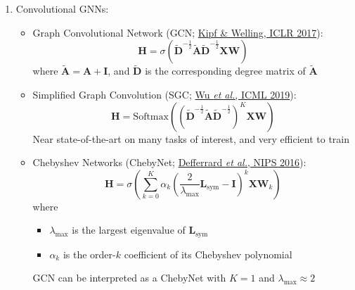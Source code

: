 \documentclass{article}
\begin{document}
\begin{enumerate}
\begin{figure}[h]
\begin{subfigure}[b]{0.3\textwidth}
			\caption{Message-passing}
			\label{fig:message-passing-gnn}
		\end{subfigure}
	\end{figure}
	\vspace*{-1.5\baselineskip}
	$$\begin{array}{ccc}
		\hspace*{-3em}\mathbf{h}_i=\phi\left(\mathbf{x}_i,\displaystyle\bigoplus_{j\in\mathcal{N}_i}c_{ij}\psi(\mathbf{x}_j)\right) & 
		\mathbf{h}_i=\phi\left(\mathbf{x}_i,\displaystyle\bigoplus_{j\in\mathcal{N}_i}a(\mathbf{x}_i,\mathbf{x}_j)\psi(\mathbf{x}_j)\right) &
		\mathbf{h}_i=\phi\left(\mathbf{x}_i,\displaystyle\bigoplus_{j\in\mathcal{N}_i}\psi(\mathbf{x}_i,\mathbf{x}_j)\right)
	\end{array}$$
	
	\item Convolutional GNNs:
	\begin{itemize}[topsep=0pt]
		\item Graph Convolutional Network (GCN; \href{https://openreview.net/pdf?id=SJU4ayYgl}{Kipf \& Welling, ICLR 2017}):
		$$\mathbf{H}=\sigma\left(\tilde{\mathbf{D}}^{-\frac{1}{2}}\tilde{\mathbf{A}}\tilde{\mathbf{D}}^{-\frac{1}{2}}\mathbf{X}\mathbf{W}\right)$$
		where $\tilde{\mathbf{A}}=\mathbf{A}+\mathbf{I}$, and $\tilde{\mathbf{D}}$ is the corresponding degree matrix of $\tilde{\mathbf{A}}$
		\item Simplified Graph Convolution (SGC; \href{http://proceedings.mlr.press/v97/wu19e/wu19e.pdf}{Wu \textit{et al.}, ICML 2019}):
		$$\mathbf{H}=\text{Softmax}\left(\left(\tilde{\mathbf{D}}^{-\frac{1}{2}}\tilde{\mathbf{A}}\tilde{\mathbf{D}}^{-\frac{1}{2}}\right)^K\mathbf{X}\mathbf{W}\right)$$
		Near state-of-the-art on many tasks of interest, and very efficient to train
		\item Chebyshev Networks (ChebyNet; \href{https://papers.nips.cc/paper/2016/file/04df4d434d481c5bb723be1b6df1ee65-Paper.pdf}{Defferrard \textit{et al.}, NIPS 2016}):
		$$\mathbf{H}=\sigma\left(\sum_{k=0}^K\alpha_k\left(\frac{2}{\lambda_\text{max}}\mathbf{L}_\text{sym}-\mathbf{I}\right)^k\mathbf{X}\mathbf{W}_k\right)$$
		where 
		\begin{itemize}[topsep=0pt]
			\item $\lambda_\text{max}$ is the largest eigenvalue of $\mathbf{L}_\text{sym}$ 
			\item $\alpha_k$ is the order-$k$ coefficient of its Chebyshev polynomial
		\end{itemize}
		GCN can be interpreted as a ChebyNet with $K=1$ and $\lambda_\text{max}\approx2$
	\end{itemize}
	
\end{enumerate}
\end{document}
